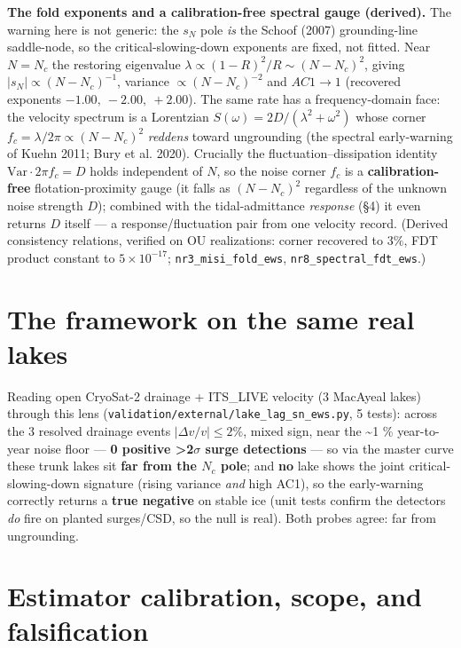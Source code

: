 \documentclass[tc, manuscript]{copernicus}
\begin{document}
\textbf{The fold exponents and a calibration-free spectral gauge (derived).} The warning here is not generic: the $s_{N}$ pole \emph{is} the Schoof (2007) grounding-line saddle-node, so the critical-slowing-down exponents are fixed, not fitted. Near $N=N_{c}$ the restoring eigenvalue $\lambda \propto (1-R)^{2}/R\sim (N-N_{c})^{2}$, giving $|s_{N}|\propto (N-N_{c})^{-1}$, variance $\propto (N-N_{c})^{-2}$ and $AC1\to 1$ (recovered exponents $-1.00,\ -2.00,\ +2.00$). The same rate has a frequency-domain face: the velocity spectrum is a Lorentzian $S(\omega )=2D/(\lambda ^{2}+\omega ^{2})$ whose corner $f_{c}=\lambda /2\pi \propto (N-N_{c})^{2}$ \emph{reddens} toward ungrounding (the spectral early-warning of Kuehn 2011; Bury et al. 2020). Crucially the fluctuation--dissipation identity $\mathrm{Var}\cdot 2\pi f_{c}=D$ holds independent of $N$, so the noise corner $f_{c}$ is a \textbf{calibration-free} flotation-proximity gauge (it falls as $(N-N_{c})^{2}$ regardless of the unknown noise strength $D$); combined with the tidal-admittance \emph{response} (§4) it even returns $D$ itself --- a response/fluctuation pair from one velocity record. (Derived consistency relations, verified on OU realizations: corner recovered to $3\%$, FDT product constant to $5\times 10^{-17}$; \texttt{nr3\_\allowbreak{}misi\_\allowbreak{}fold\_\allowbreak{}ews}, \texttt{nr8\_\allowbreak{}spectral\_\allowbreak{}fdt\_\allowbreak{}ews}.)

\section{The framework on the same real lakes}

Reading open CryoSat-2 drainage + ITS\_LIVE velocity (3 MacAyeal lakes) through this lens (\texttt{validation/\allowbreak{}external/\allowbreak{}lake\_\allowbreak{}lag\_\allowbreak{}sn\_\allowbreak{}ews.\allowbreak{}py}, 5 tests): across the 3 resolved drainage events $|\Delta v/v|\le 2 \%$, mixed sign, near the \textasciitilde{}1 \% year-to-year noise floor — \textbf{0 positive >2\ensuremath{\sigma} surge detections} — so via the master curve these trunk lakes sit \textbf{far from the $N_{c}$ pole}; and \textbf{no} lake shows the joint critical-slowing-down signature (rising variance \emph{and} high AC1), so the early-warning correctly returns a \textbf{true negative} on stable ice (unit tests confirm the detectors \emph{do} fire on planted surges/CSD, so the null is real). Both probes agree: far from ungrounding.

\section{Estimator calibration, scope, and falsification}
\end{document}
